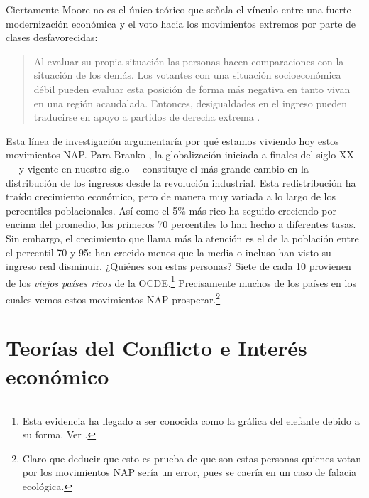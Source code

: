 Ciertamente Moore no es el único teórico que señala el vínculo entre una fuerte modernización económica y el voto hacia los movimientos extremos por parte de clases desfavorecidas: 
\begin{quote}
Al evaluar su propia situación las personas hacen comparaciones con la situación de los demás. Los votantes con una situación socioeconómica débil pueden evaluar esta posición de forma más negativa en tanto vivan en una región acaudalada. Entonces, desigualdades en el ingreso pueden traducirse en apoyo a partidos de derecha extrema \parencite[144, traducción propia]{Coffe07}.
\end{quote} Esta línea de investigación argumentaría por qué estamos viviendo hoy estos movimientos NAP. Para Branko \textcite{Milanovic16}, la globalización iniciada a finales del siglo XX--- y vigente en nuestro siglo--- constituye el más grande cambio en la distribución de los ingresos desde la revolución industrial. Esta redistribución ha traído crecimiento económico, pero de manera muy variada a lo largo de los percentiles poblacionales. Así como el 5\% más rico ha seguido creciendo por encima del promedio, los primeros 70 percentiles lo han hecho a diferentes tasas. Sin embargo, el crecimiento que llama más la atención es el de la población entre el percentil 70 y 95: han crecido menos que la media o incluso han visto su ingreso real disminuir. ¿Quiénes son estas personas? Siete de cada 10 provienen de los \textit{viejos países ricos} de la OCDE.\footnote{Esta evidencia ha llegado a ser conocida como la gráfica del elefante debido a su forma. Ver \textcite{Milanovic16}.} Precisamente muchos de los países en los cuales vemos estos movimientos NAP prosperar.\footnote{Claro que deducir que esto es prueba de que son estas personas quienes votan por los movimientos NAP sería un error, pues se caería en un caso de falacia ecológica.}\\

\section{Teorías del Conflicto e Interés económico}

